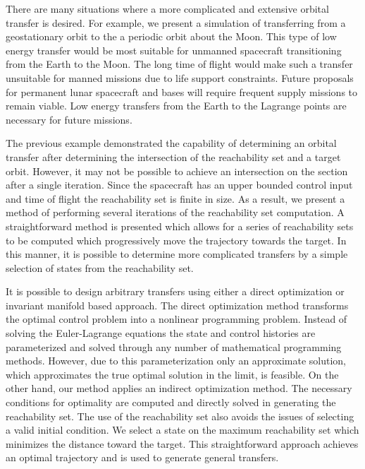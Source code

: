 \documentclass[preprint]{elsarticle}
\begin{document}
There are many situations where a more complicated and extensive orbital transfer is desired. 
For example, we present a simulation of transferring from a geostationary orbit to the a periodic orbit about the Moon.
This type of low energy transfer would be most suitable for unmanned spacecraft transitioning from the Earth to the Moon.
The long time of flight would make such a transfer unsuitable for manned missions due to life support constraints.
Future proposals for permanent lunar spacecraft and bases will require frequent supply missions to remain viable. 
Low energy transfers from the Earth to the Lagrange points are necessary for future missions.

The previous example demonstrated the capability of determining an orbital transfer after determining the intersection of the reachability set and a target orbit.
However, it may not be possible to achieve an intersection on the \Poincare section after a single iteration. 
Since the spacecraft has an upper bounded control input and time of flight the reachability set is finite in size. 
As a result, we present a method of performing several iterations of the reachability set computation. 
A straightforward method is presented which allows for a series of reachability sets to be computed which progressively move the trajectory towards the target.
In this manner, it is possible to determine more complicated transfers by a simple selection of states from the reachability set.

It is possible to design arbitrary transfers using either a direct optimization or invariant manifold based approach.
The direct optimization method transforms the optimal control problem into a nonlinear programming problem.
Instead of solving the Euler-Lagrange equations the state and control histories are parameterized and solved through any number of mathematical programming methods.
However, due to this parameterization only an approximate solution, which approximates the true optimal solution in the limit, is feasible. 
On the other hand, our method applies an indirect optimization method.
The necessary conditions for optimality are computed and directly solved in generating the reachability set. 
The use of the reachability set also avoids the issues of selecting a valid initial condition.
We select a state on the maximum reachability set which minimizes the distance toward the target. 
This straightforward approach achieves an optimal trajectory and is used to generate general transfers.
\end{document}

